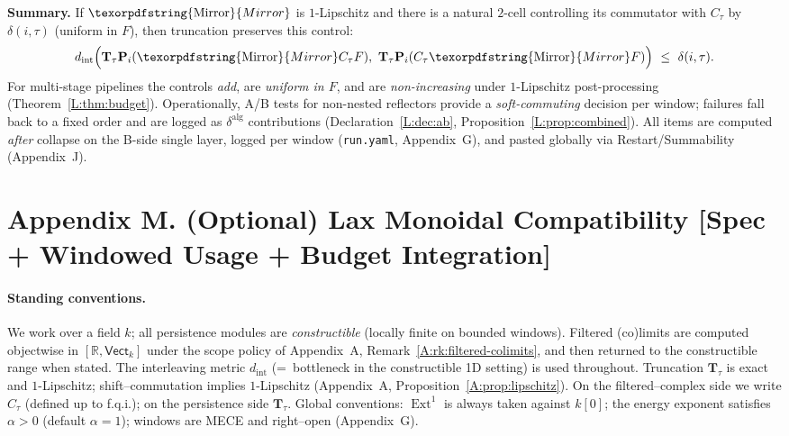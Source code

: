 \documentclass[11pt]{article}
\DeclareMathOperator{\Ext}{Ext}
\DeclareRobustCommand{\hyp}{\nobreakdash-}
\numberwithin{equation}{section}
\theoremstyle{definition}
\DeclareRobustCommand{\Mirror}{\texorpdfstring{\ensuremath{\operatorname{Mirror}}}{Mirror}}
\begin{document}
\medskip
\noindent\textbf{Summary.}
If \(\Mirror\) is \(1\)\hyp Lipschitz and there is a natural \(2\)\hyp cell controlling its commutator with \(C_\tau\) by \(\delta(i,\tau)\) (uniform in \(F\)), then truncation preserves this control:
\[
d_{\mathrm{int}}\Big(\mathbf{T}_\tau\mathbf{P}_i(\Mirror C_\tau F),\ \mathbf{T}_\tau\mathbf{P}_i(C_\tau\Mirror F)\Big)\ \le\ \delta(i,\tau).
\]
For multi-stage pipelines the controls \emph{add}, are \emph{uniform in \(F\)}, and are \emph{non\hyp increasing} under \(1\)\hyp Lipschitz post\hyp processing (Theorem~\ref{L:thm:budget}).
Operationally, A/B tests for non\hyp nested reflectors provide a \emph{soft\hyp commuting} decision per window; failures fall back to a fixed order and are logged as \(\delta^{\mathrm{alg}}\) contributions (Declaration~\ref{L:dec:ab}, Proposition~\ref{L:prop:combined}).
All items are computed \emph{after} collapse on the B\hyp side single layer, logged per window (\texttt{run.yaml}, Appendix~G), and pasted globally via Restart/Summability (Appendix~J).



\section*{Appendix M. (Optional) Lax Monoidal Compatibility [Spec + Windowed Usage + Budget Integration]}
{}
\label{M:lax-monoidal}

\paragraph{Standing conventions.}
We work over a field \(k\); all persistence modules are \emph{constructible} (locally finite on bounded windows).
Filtered (co)limits are computed objectwise in \([\mathbb{R},\mathsf{Vect}_k]\) under the scope policy of Appendix~A, Remark~\ref{A:rk:filtered-colimits}, and then returned to the constructible range when stated.
The interleaving metric \(d_{\mathrm{int}}\) (=\ bottleneck in the constructible 1D setting) is used throughout.
Truncation \(\mathbf{T}_\tau\) is exact and \(1\)\hyp Lipschitz; shift–commutation implies \(1\)\hyp Lipschitz (Appendix~A, Proposition~\ref{A:prop:lipschitz}).
On the filtered–complex side we write \(C_\tau\) (defined up to f.q.i.); on the persistence side \(\mathbf{T}_\tau\).
Global conventions: \(\Ext^1\) is always taken against \(k[0]\); the energy exponent satisfies \(\alpha>0\) (default \(\alpha=1\)); windows are MECE and right–open (Appendix~G).
\end{document}
